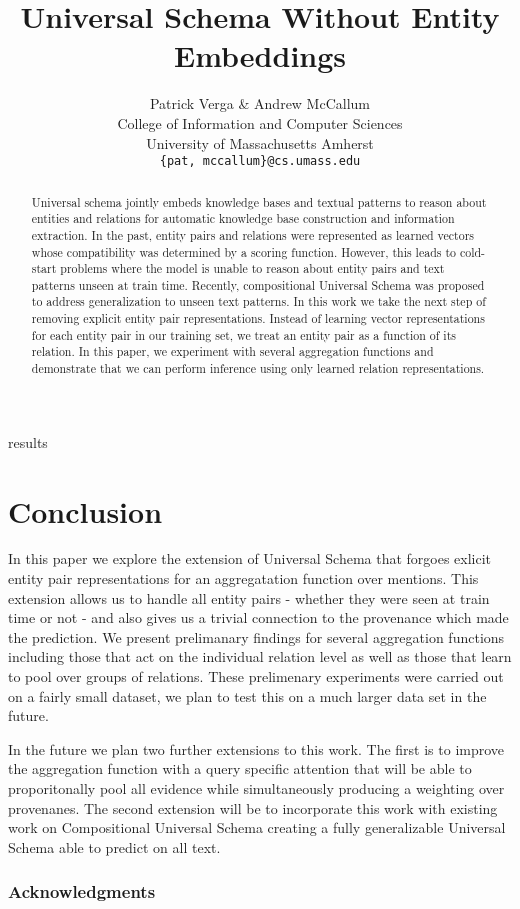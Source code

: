 \documentclass{article} %
\title{Universal Schema Without Entity Embeddings}
\author{Patrick Verga \& Andrew McCallum \\
    College of Information and Computer Sciences\\
    University of Massachusetts Amherst\\
    \texttt{\{pat, mccallum\}@cs.umass.edu} \\
}
\begin{document}
\maketitle

\begin{abstract}
Universal schema jointly embeds knowledge bases and textual patterns to reason about entities and relations for automatic knowledge base construction and information extraction.
In the past, entity pairs and relations were represented as learned vectors whose compatibility was determined by a scoring function.
However, this leads to cold-start problems where the model is unable to reason about entity pairs and text patterns unseen at train time.
Recently, compositional Universal Schema was proposed to address generalization to unseen text patterns.
In this work we take the next step of removing explicit entity pair representations.
Instead of learning vector representations for each entity pair in our training set, we treat an entity pair as a function of its relation.
In this paper, we experiment with several aggregation functions and demonstrate that we can perform inference using only learned relation representations.
\end{abstract}







 {results}

\section{Conclusion}
In this paper we explore the extension of Universal Schema that forgoes exlicit entity pair representations for an aggregatation function over mentions.
This extension allows us to handle all entity pairs - whether they were seen at train time or not - and also gives us a trivial connection to the provenance which made the prediction.
We present prelimanary findings for several aggregation functions including those that act on the individual relation level as well as those that learn to pool over groups of relations.
These prelimenary experiments were carried out on a fairly small dataset, we plan to test this on a much larger data set in the future.

In the future we plan two further extensions to this work.
The first is to improve the aggregation function with a query specific attention that will be able to proporitonally pool all evidence while simultaneously producing a weighting over provenanes.
The second extension will be to incorporate this work with existing work on Compositional Universal Schema creating a fully generalizable Universal Schema able to predict on all text.


\subsubsection*{Acknowledgments}




\newpage
%
\end{document}
